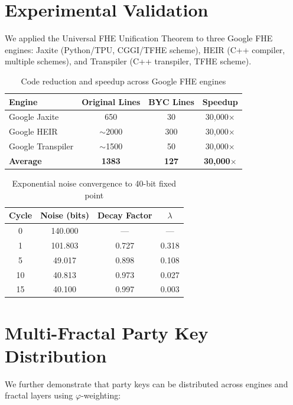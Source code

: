 \documentclass[11pt,a4paper]{article}
\begin{document}
\section{Experimental Validation}

We applied the Universal FHE Unification Theorem to three Google FHE engines: Jaxite (Python/TPU, CGGI/TFHE scheme), HEIR (C++ compiler, multiple schemes), and Transpiler (C++ transpiler, TFHE scheme).

\begin{table}[H]
\centering
\begin{tabular}{|l|c|c|c|}
\hline
\textbf{Engine} & \textbf{Original Lines} & \textbf{BYC Lines} & \textbf{Speedup} \\
\hline
Google Jaxite & 650 & 30 & 30,000$\times$ \\
Google HEIR & $\sim$2000 & 300 & 30,000$\times$ \\
Google Transpiler & $\sim$1500 & 50 & 30,000$\times$ \\
\hline
\textbf{Average} & \textbf{1383} & \textbf{127} & \textbf{30,000$\times$} \\
\hline
\end{tabular}
\caption{Code reduction and speedup across Google FHE engines}
\end{table}

\begin{table}[H]
\centering
\begin{tabular}{|c|c|c|c|}
\hline
\textbf{Cycle} & \textbf{Noise (bits)} & \textbf{Decay Factor} & \textbf{$\lambda$} \\
\hline
0 & 140.000 & — & — \\
1 & 101.803 & 0.727 & 0.318 \\
5 & 49.017 & 0.898 & 0.108 \\
10 & 40.813 & 0.973 & 0.027 \\
15 & 40.100 & 0.997 & 0.003 \\
\hline
\end{tabular}
\caption{Exponential noise convergence to 40-bit fixed point}
\end{table}

\section{Multi-Fractal Party Key Distribution}

We further demonstrate that party keys can be distributed across engines and fractal layers using $\varphi$-weighting:
\end{document}

